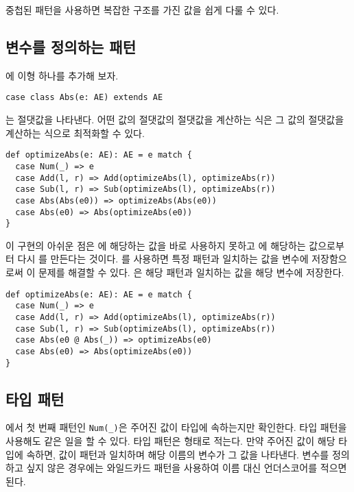 중첩된 패턴을 사용하면 복잡한 구조를 가진 값을 쉽게 다룰 수 있다.

\subsection{변수를 정의하는 패턴}

에 이형 하나를 추가해 보자.

\begin{verbatim}
case class Abs(e: AE) extends AE
\end{verbatim}

는 절댓값을 나타낸다. 어떤 값의 절댓값의 절댓값을 계산하는 식은 그
값의 절댓값을 계산하는 식으로 최적화할 수 있다.

\begin{verbatim}
def optimizeAbs(e: AE): AE = e match {
  case Num(_) => e
  case Add(l, r) => Add(optimizeAbs(l), optimizeAbs(r))
  case Sub(l, r) => Sub(optimizeAbs(l), optimizeAbs(r))
  case Abs(Abs(e0)) => optimizeAbs(Abs(e0))
  case Abs(e0) => Abs(optimizeAbs(e0))
}
\end{verbatim}

이 구현의 아쉬운 점은 에 해당하는 값을 바로 사용하지 못하고
에 해당하는 값으로부터 다시 를 만든다는 것이다.
를 사용하면 특정 패턴과 일치하는 값을 변수에 저장함으로써 이 문제를
해결할 수 있다. 은 해당 패턴과 일치하는 값을 해당
변수에 저장한다.

\begin{verbatim}
def optimizeAbs(e: AE): AE = e match {
  case Num(_) => e
  case Add(l, r) => Add(optimizeAbs(l), optimizeAbs(r))
  case Sub(l, r) => Sub(optimizeAbs(l), optimizeAbs(r))
  case Abs(e0 @ Abs(_)) => optimizeAbs(e0)
  case Abs(e0) => Abs(optimizeAbs(e0))
}
\end{verbatim}

\subsection{타입 패턴}

에서 첫 번째 패턴인 \verb!Num(_)!은 주어진 값이 
타입에 속하는지만 확인한다. 타입 패턴을 사용해도 같은 일을 할 수 있다. 타입
패턴은 \code{[name]: [type]} 형태로 적는다. 만약 주어진 값이 해당 타입에 속하면,
값이 패턴과 일치하며 해당 이름의 변수가 그 값을 나타낸다. 변수를 정의하고 싶지
않은 경우에는 와일드카드 패턴을 사용하여 이름 대신 언더스코어를 적으면 된다.

